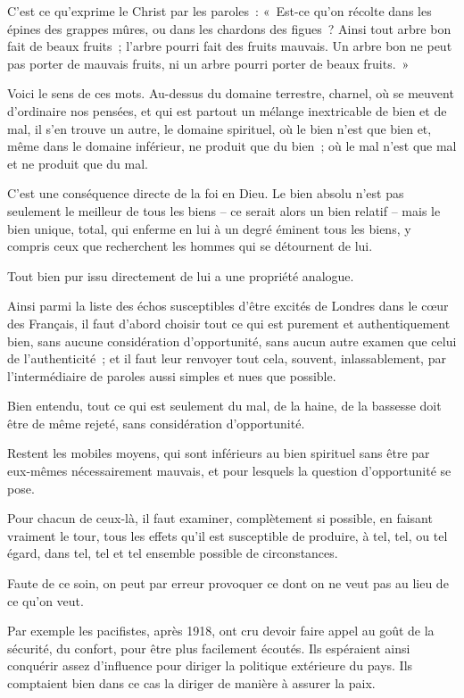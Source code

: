 \documentclass[french,twoside]{book} %
\begin{document}
C'est ce qu'exprime le Christ par les paroles : « Est-ce qu'on récolte dans les épines des grappes mûres, ou dans les chardons des figues ? Ainsi tout arbre bon fait de beaux fruits ; l'arbre pourri fait des fruits mauvais. Un arbre bon ne peut pas porter de mauvais fruits, ni un arbre pourri porter de beaux fruits. »\par
Voici le sens de ces mots. Au-dessus du domaine terrestre, charnel, où se meuvent d'ordinaire nos pensées, et qui est partout un mélange inextricable de bien et de mal, il s'en trouve un autre, le domaine spirituel, où le bien n'est que bien et, même dans le domaine inférieur, ne produit que du bien ; où le mal n'est que mal et ne produit que du mal.\par
C'est une conséquence directe de la foi en Dieu. Le bien absolu n'est pas seulement le meilleur de tous les biens – ce serait alors un bien relatif – mais le bien unique, total, qui enferme en lui à un degré éminent tous les biens, y compris ceux que recherchent les hommes qui se détournent de lui.\par
Tout bien pur issu directement de lui a une propriété analogue.\par
Ainsi parmi la liste des échos susceptibles d'être excités de Londres dans le cœur des Français, il faut d'abord choisir tout ce qui est purement et authentiquement bien, sans aucune considération d'opportunité, sans aucun autre examen que celui de l'authenticité ; et il faut leur renvoyer tout cela, souvent, inlassablement, par l'intermédiaire de paroles aussi simples et nues que possible.\par
Bien entendu, tout ce qui est seulement du mal, de la haine, de la bassesse doit être de même rejeté, sans considération d'opportunité.\par
Restent les mobiles moyens, qui sont inférieurs au bien spirituel sans être par eux-mêmes nécessairement mauvais, et pour lesquels la question d'opportunité se pose.\par
Pour chacun de ceux-là, il faut examiner, complètement si possible, en faisant vraiment le tour, tous les effets qu'il est susceptible de produire, à tel, tel, ou tel égard, dans tel, tel et tel ensemble possible de circonstances.\par
Faute de ce soin, on peut par erreur provoquer ce dont on ne veut pas au lieu de ce qu'on veut.\par
Par exemple les pacifistes, après 1918, ont cru devoir faire appel au goût de la sécurité, du confort, pour être plus facilement écoutés. Ils espéraient ainsi conquérir assez d'influence pour diriger la politique extérieure du pays. Ils comptaient bien dans ce cas la diriger de manière à assurer la paix.\par
\end{document}
